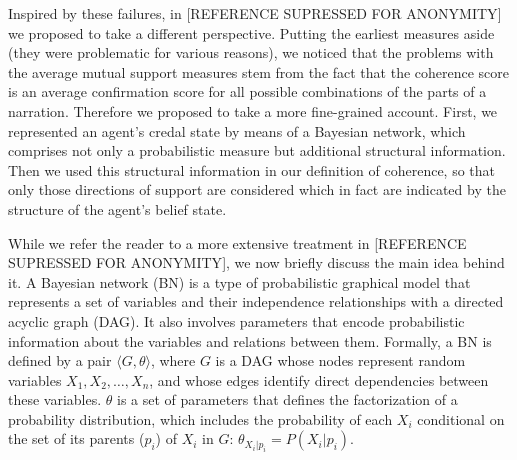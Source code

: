 \documentclass[
  10pt,
]{scrartcl}
\begin{document}
Inspired by these failures, in {[}REFERENCE SUPRESSED FOR ANONYMITY{]} we proposed to take a different perspective. Putting the earliest measures aside (they were problematic for various reasons), we noticed that the problems with the average mutual support measures stem from the fact that the coherence score is an average confirmation score for all possible combinations of the parts of a narration. Therefore we proposed to take a more fine-grained account. First, we represented an agent's credal state by means of a Bayesian network, which comprises not only a probabilistic measure but additional structural information. Then we used this structural information in our definition of coherence, so that only those directions of support are considered which in fact are indicated by the structure of the agent's belief state.

While we refer the reader to a more extensive treatment in {[}REFERENCE SUPRESSED FOR ANONYMITY{]}, we now briefly discuss the main idea behind it. A Bayesian network (BN) is a type of probabilistic graphical model that represents a set of variables and their independence relationships with a directed acyclic graph (DAG). It also involves parameters that encode probabilistic information about the variables and relations between them. Formally, a BN is defined by a pair \(\langle G, \theta \rangle\), where \(G\) is a DAG whose nodes represent random variables \(X_1, X_2, \dots, X_n\), and whose edges identify direct dependencies between these variables. \(\theta\) is a set of parameters that defines the factorization of a probability distribution, which includes the probability of each \(X_i\) conditional on the set of its parents (\(p_i\)) of \(X_i\) in \(G\): \(\theta_{X_i \vert p_i}=P(X_i \vert p_i)\).
\end{document}
